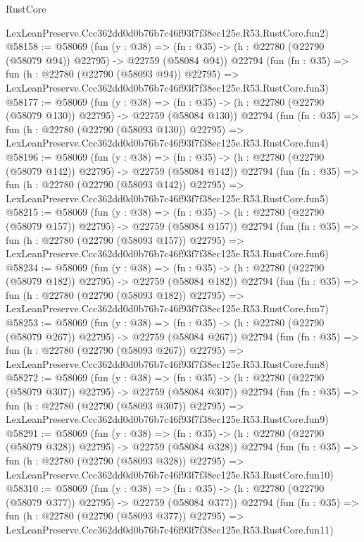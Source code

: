 \begin{lexlean}{RustCore}
\begin{coremodule}
    LexLeanPreserve.Ccc362dd0d0b76b7c46f93f7f38ec125e.R53.RustCore.fun2)
@58158 := @58069
    (fun (y : @38) =>
    (fn : @35) -> (h : @22780 (@22790 (@58079 @94)) @22795) -> @22759 (@58084 @94))
    @22794
    (fun (fn : @35) =>
    fun (h : @22780 (@22790 (@58093 @94)) @22795) =>
    LexLeanPreserve.Ccc362dd0d0b76b7c46f93f7f38ec125e.R53.RustCore.fun3)
@58177 := @58069
    (fun (y : @38) =>
    (fn : @35) -> (h : @22780 (@22790 (@58079 @130)) @22795) -> @22759 (@58084 @130))
    @22794
    (fun (fn : @35) =>
    fun (h : @22780 (@22790 (@58093 @130)) @22795) =>
    LexLeanPreserve.Ccc362dd0d0b76b7c46f93f7f38ec125e.R53.RustCore.fun4)
@58196 := @58069
    (fun (y : @38) =>
    (fn : @35) -> (h : @22780 (@22790 (@58079 @142)) @22795) -> @22759 (@58084 @142))
    @22794
    (fun (fn : @35) =>
    fun (h : @22780 (@22790 (@58093 @142)) @22795) =>
    LexLeanPreserve.Ccc362dd0d0b76b7c46f93f7f38ec125e.R53.RustCore.fun5)
@58215 := @58069
    (fun (y : @38) =>
    (fn : @35) -> (h : @22780 (@22790 (@58079 @157)) @22795) -> @22759 (@58084 @157))
    @22794
    (fun (fn : @35) =>
    fun (h : @22780 (@22790 (@58093 @157)) @22795) =>
    LexLeanPreserve.Ccc362dd0d0b76b7c46f93f7f38ec125e.R53.RustCore.fun6)
@58234 := @58069
    (fun (y : @38) =>
    (fn : @35) -> (h : @22780 (@22790 (@58079 @182)) @22795) -> @22759 (@58084 @182))
    @22794
    (fun (fn : @35) =>
    fun (h : @22780 (@22790 (@58093 @182)) @22795) =>
    LexLeanPreserve.Ccc362dd0d0b76b7c46f93f7f38ec125e.R53.RustCore.fun7)
@58253 := @58069
    (fun (y : @38) =>
    (fn : @35) -> (h : @22780 (@22790 (@58079 @267)) @22795) -> @22759 (@58084 @267))
    @22794
    (fun (fn : @35) =>
    fun (h : @22780 (@22790 (@58093 @267)) @22795) =>
    LexLeanPreserve.Ccc362dd0d0b76b7c46f93f7f38ec125e.R53.RustCore.fun8)
@58272 := @58069
    (fun (y : @38) =>
    (fn : @35) -> (h : @22780 (@22790 (@58079 @307)) @22795) -> @22759 (@58084 @307))
    @22794
    (fun (fn : @35) =>
    fun (h : @22780 (@22790 (@58093 @307)) @22795) =>
    LexLeanPreserve.Ccc362dd0d0b76b7c46f93f7f38ec125e.R53.RustCore.fun9)
@58291 := @58069
    (fun (y : @38) =>
    (fn : @35) -> (h : @22780 (@22790 (@58079 @328)) @22795) -> @22759 (@58084 @328))
    @22794
    (fun (fn : @35) =>
    fun (h : @22780 (@22790 (@58093 @328)) @22795) =>
    LexLeanPreserve.Ccc362dd0d0b76b7c46f93f7f38ec125e.R53.RustCore.fun10)
@58310 := @58069
    (fun (y : @38) =>
    (fn : @35) -> (h : @22780 (@22790 (@58079 @377)) @22795) -> @22759 (@58084 @377))
    @22794
    (fun (fn : @35) =>
    fun (h : @22780 (@22790 (@58093 @377)) @22795) =>
    LexLeanPreserve.Ccc362dd0d0b76b7c46f93f7f38ec125e.R53.RustCore.fun11)

\end{coremodule}
\end{lexlean}

